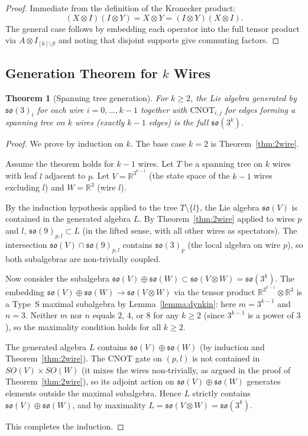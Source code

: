 \documentclass[12pt,a4paper]{article}
\newtheorem{theorem}{Theorem}
\begin{document}
\begin{proof}
Immediate from the definition of the Kronecker product:
\[
(X \otimes I)(I \otimes Y) = X \otimes Y = (I \otimes Y)(X \otimes I).
\]
The general case follows by embedding each operator into the full tensor
product via $A \otimes I_{[k]\setminus S}$ and noting that disjoint
supports give commuting factors.
\end{proof}

\subsection{Generation Theorem for $k$ Wires}

\begin{theorem}[Spanning tree generation]
\label{thm:ktree}
For $k \ge 2$, the Lie algebra generated by $\mathfrak{so}(3)_i$ for
each wire $i = 0,\dots,k-1$ together with $\text{CNOT}_{i,j}$ for edges
forming a spanning tree on $k$ wires (exactly $k-1$ edges) is the full
$\mathfrak{so}(3^k)$.
\end{theorem}

\begin{proof}
We prove by induction on $k$. The base case $k=2$ is
Theorem~\ref{thm:2wire}.

Assume the theorem holds for $k-1$ wires. Let $T$ be a spanning tree on
$k$ wires with leaf $l$ adjacent to $p$. Let $V = \mathbb{R}^{3^{k-1}}$
(the state space of the $k-1$ wires excluding $l$) and
$W = \mathbb{R}^3$ (wire $l$).

By the induction hypothesis applied to the tree $T\setminus\{l\}$,
the Lie algebra $\mathfrak{so}(V)$ is contained in the generated
algebra $L$. By Theorem~\ref{thm:2wire} applied to wires $p$ and $l$,
$\mathfrak{so}(9)_{p,l} \subset L$ (in the lifted sense, with all other
wires as spectators). The intersection
$\mathfrak{so}(V) \cap \mathfrak{so}(9)_{p,l}$ contains
$\mathfrak{so}(3)_p$ (the local algebra on wire $p$), so both
subalgebras are non-trivially coupled.

Now consider the subalgebra $\mathfrak{so}(V) \oplus \mathfrak{so}(W)
\subset \mathfrak{so}(V\otimes W) = \mathfrak{so}(3^k)$. The embedding
$\mathfrak{so}(V)\oplus\mathfrak{so}(W) \to \mathfrak{so}(V\otimes W)$
via the tensor product $\mathbb{R}^{3^{k-1}}\otimes\mathbb{R}^3$ is a
Type~S maximal subalgebra by Lemma~\ref{lemma:dynkin}: here $m = 3^{k-1}$
and $n = 3$. Neither $m$ nor $n$ equals $2$, $4$, or $8$ for any $k \ge 2$
(since $3^{k-1}$ is a power of $3$), so the maximality condition holds
for all $k\ge 2$.

The generated algebra $L$ contains $\mathfrak{so}(V)\oplus\mathfrak{so}(W)$
(by induction and Theorem~\ref{thm:2wire}). The CNOT gate on $(p,l)$
is not contained in $SO(V)\times SO(W)$ (it mixes the wires non-trivially,
as argued in the proof of Theorem~\ref{thm:2wire}), so its adjoint action
on $\mathfrak{so}(V)\oplus\mathfrak{so}(W)$ generates elements outside
the maximal subalgebra. Hence $L$ strictly contains
$\mathfrak{so}(V)\oplus\mathfrak{so}(W)$, and by maximality
$L = \mathfrak{so}(V\otimes W) = \mathfrak{so}(3^k)$.

This completes the induction.
\end{proof}
\end{document}
